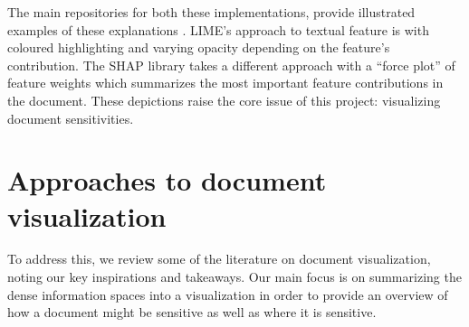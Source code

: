 \documentclass[\version]{l4proj}
\begin{document}
The main repositories for both these implementations, provide illustrated examples of these explanations \autocite{lundbergSlundbergShap2020,ribeiroMarcotcrLime2020}.
LIME's approach to textual feature is with coloured highlighting and varying opacity depending on the feature's contribution.
The SHAP library takes a different approach with a ``force plot'' of feature weights which summarizes the most important feature contributions in the document.
These depictions raise the core issue of this project: visualizing document sensitivities.

\section{Approaches to document visualization}

To address this, we review some of the literature on document visualization, noting our key inspirations and takeaways.
Our main focus is on summarizing the dense information spaces into a visualization in order to provide an overview of how a document might be sensitive as well as where it is sensitive.

\pagebreak
\end{document}
